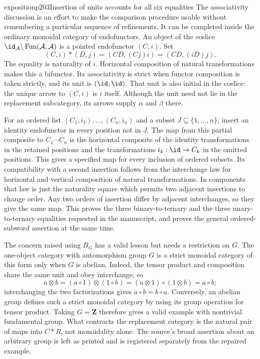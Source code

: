 \begin{dcomment}{exposition}{p203}{Insertion of units accounts for all six equalities}
The associativity discussion is an effort to make the comparison procedure usable without remembering a particular sequence of refinements. It can be completed inside the ordinary monoidal category of endofunctors. An object of the coslice $\id_{\mathcal A}\backslash\operatorname{Fun}(\mathcal A,\mathcal A)$ is a pointed endofunctor $(C,i)$. Set
\[
 (C,i)*(D,j)=(CD,(Cj)i)=(CD,(iD)j).
\]
The equality is naturality of $i$. Horizontal composition of natural transformations makes this a bifunctor. Its associativity is strict when functor composition is taken strictly, and its unit is $(\id,\id)$. That unit is also initial in the coslice: the unique arrow to $(C,i)$ is $i$ itself. Although the unit need not lie in the replacement subcategory, its arrows supply $\alpha$ and $\beta$ there.

For an ordered list $(C_1,i_1),\ldots,(C_n,i_n)$ and a subset $J\subseteq\{1,\ldots,n\}$, insert an identity endofunctor in every position not in $J$. The map from this partial composite to $C_1\cdots C_n$ is the horizontal composite of the identity transformations in the retained positions and the transformations $i_k:\id\to C_k$ in the omitted positions. This gives a specified map for every inclusion of ordered subsets. Its compatibility with a second insertion follows from the interchange law for horizontal and vertical composition of natural transformations. In components that law is just the naturality square which permits two adjacent insertions to change order. Any two orders of insertion differ by adjacent interchanges, so they give the same map. This proves the three binary-to-ternary and the three unary-to-ternary equalities requested in the manuscript, and proves the general ordered-subword assertion at the same time.

The concern raised using $B_G$ has a valid lesson but needs a restriction on $G$. The one-object category with automorphism group $G$ is a strict monoidal category of this form only when $G$ is abelian. Indeed, the tensor product and composition share the same unit and obey interchange, so
\[
 a\otimes b=(a\circ1)\otimes(1\circ b)
 =(a\otimes1)\circ(1\otimes b)=a\circ b;
\]
interchanging the two factorizations gives $a\circ b=b\circ a$. Conversely, an abelian group defines such a strict monoidal category by using its group operation for tensor product. Taking $G=\mathbf Z$ therefore gives a valid example with nontrivial fundamental group. What contracts the replacement category is the natural pair of maps into $C*R$, not monoidality alone. The source's broad assertion about an arbitrary group is left as printed and is registered separately from the repaired example.
\end{dcomment}

